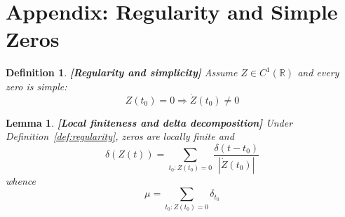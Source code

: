 \documentclass{article}
\newcommand{\tmstrong}[1]{\textbf{#1}}
\newtheorem{definition}{Definition}
\newtheorem{lemma}{Lemma}
\begin{document}
\section{Appendix: Regularity and Simple Zeros}\label{sec:appendix}

\begin{definition}
  {\tmstrong{[Regularity and simplicity]\label{def:regularity}}} Assume $Z \in
  C^1 (\mathbb{R})$ and every zero is simple:
  \begin{equation}
    Z (t_0) = 0 \Rightarrow \dot{Z} (t_0) \neq 0
  \end{equation}
\end{definition}

\begin{lemma}
  {\tmstrong{[Local finiteness and delta decomposition]\label{lem:delta}
  }}Under Definition~\ref{def:regularity}, zeros are locally finite and
  \begin{equation}
    \delta (Z (t)) = \sum_{t_0 : Z (t_0) = 0} \frac{\delta (t - t_0)}{|
    \dot{Z} (t_0) |}
  \end{equation}
  whence
  \begin{equation}
    \mu = \sum_{t_0 : Z (t_0) = 0} \delta_{t_0}
  \end{equation}
\end{lemma}
\end{document}
